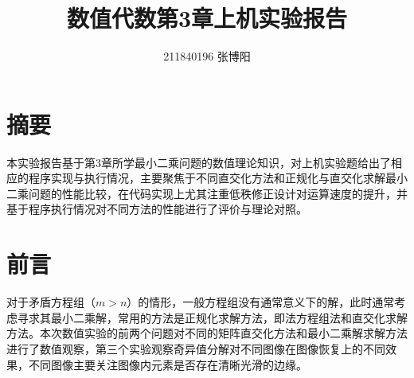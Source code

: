 \documentclass[UTF8,a4paper,10pt]{ctexart}
\title{\textbf{数值代数第3章上机实验报告}}
\author{ 211840196 张博阳 }
\date{}
\begin{document}
    \maketitle
 
    \section*{摘要}
        \par
        本实验报告基于第3章所学最小二乘问题的数值理论知识，对上机实验题给出了相应的程序实现与执行情况，主要聚焦于不同直交化方法和正规化与直交化求解最小二乘问题的性能比较，在代码实现上尤其注重低秩修正设计对运算速度的提升，并基于程序执行情况对不同方法的性能进行了评价与理论对照。

    \section{前言}
        \par
        对于矛盾方程组（$m>n$）的情形，一般方程组没有通常意义下的解，此时通常考虑寻求其最小二乘解，常用的方法是正规化求解方法，即法方程组法和直交化求解方法。本次数值实验的前两个问题对不同的矩阵直交化方法和最小二乘解求解方法进行了数值观察，第三个实验观察奇异值分解对不同图像在图像恢复上的不同效果，不同图像主要关注图像内元素是否存在清晰光滑的边缘。
        
\end{document}
